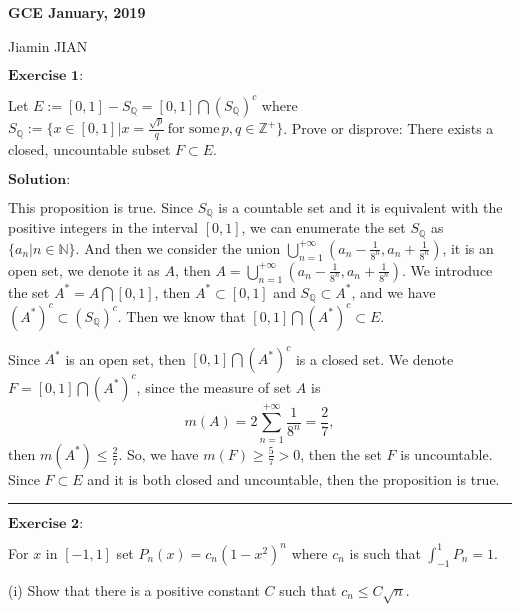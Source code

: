 \documentclass[12pt,a4paper]{ctexart}
\begin{document}
\begin{center}
\textbf{ GCE January, 2019}
\vspace{8pt}

Jiamin JIAN
\end{center}

\vspace{12pt}

$\textbf{Exercise 1:}$

Let $E:= [0, 1] - S_{\mathbb{Q}} = [0, 1] \bigcap (S_{\mathbb{Q}})^{c}$ where $S_{\mathbb{Q}} := \{x \in [0, 1] | x = \frac{\sqrt{p}}{q}   \,  \text{for some} \, p, q \in \mathbb{Z}^{+} \}$. Prove or disprove: There exists a closed, uncountable subset $F \subset E$.

\vspace{8pt}

$\textbf{Solution:}$

This proposition is true. Since $S_{\mathbb{Q}}$ is a countable set and it is equivalent with the positive integers in the interval $[0, 1]$, we can enumerate the set $S_{\mathbb{Q}}$ as $\{a_{n} | n \in \mathbb{N} \}$. And then we consider the union $\bigcup_{n = 1}^{+ \infty}(a_{n} - \frac{1}{8^{n}}, a_{n} + \frac{1}{8^{n}})$, it is an open set, we denote it as $A$, then $A = \bigcup_{n = 1}^{+ \infty}(a_{n} - \frac{1}{8^{n}}, a_{n} + \frac{1}{8^{n}})$. We introduce the set $A^{*} = A \bigcap [0, 1]$, then $A^{*} \subset [0,1]$ and $S_{\mathbb{Q}} \subset A^{*}$, and we have $(A^{*})^{c} \subset (S_{\mathbb{Q}})^{c}$. Then we know that $[0, 1] \bigcap (A^{*})^{c} \subset E$.

Since $A^{*}$ is an open set, then $[0, 1] \bigcap (A^{*})^{c}$ is a closed set. We denote $F = [0, 1] \bigcap (A^{*})^{c}$, since the measure of set $A$ is
\begin{equation*}
    m(A) = 2 \sum_{n = 1}^{+ \infty}  \frac{1}{8^{n}} = \frac{2}{7},
\end{equation*}
then $m(A^{*}) \leq \frac{2}{7}$. So, we have $m(F) \geq \frac{5}{7} > 0$, then the set $F$ is uncountable. Since $F \subset E$ and it is both closed and uncountable, then the proposition is true.

\noindent\rule[0.25\baselineskip]{\textwidth}{0.5pt}

\vspace{8pt}
$\textbf{Exercise 2:}$

For $x$ in $[-1, 1]$ set $P_{n} (x) = c_{n} (1 - x^{2})^{n}$ where $c_{n}$ is such that $\int_{-1}^{1} P_{n} = 1.$

(i) Show that there is a positive constant $C$ such that $c_{n} \leq C \sqrt{n}$.
\end{document}

